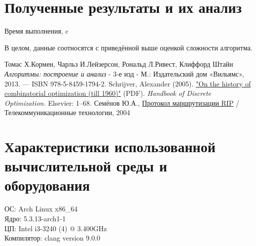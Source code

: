 \documentclass[a4paper,12pt]{article}
\begin{document}
\section{Полученные результаты и их анализ}
\begin{center}
  \begin{table}[h]
    \caption{Время выполнения, c}
  \end{table}
\end{center}
В целом, данные соотносятся с приведённой выше оценкой сложности алгоритма.
\begin{thebibliography}{9}
    Томас Х.Кормен, Чарльз И.Лейзерсон, Рональд Л.Ривест, Клиффорд Штайн
    \textit{Алгоритмы: построение и анализ}
    - 3-е изд - М.: Издательский дом «Вильямс», 2013. — ISBN 978-5-8459-1794-2.
    Schrijver, Alexander (2005). 
    \href{https://homepages.cwi.nl/~lex/files/histco.pdf}
    {"On the history of combinatorial optimization (till 1960)"} (PDF).
    \textit{Handbook of Discrete Optimization.} Elsevier: 1–68.
    Семёнов Ю.А.,
    \href{http://citforum.ru/nets/semenov/4/44/rip44111.shtml}{Протокол маршрутизации RIP}
    / Телекоммуникационные технологии, 2004
    
\end{thebibliography}
\section{Характеристики использованной вычислительной среды и оборудования}
ОС: Arch Linux x86\_64 \\
Ядро: 5.3.13-arch1-1 \\
ЦП: Intel i3-3240 (4) @ 3.400GHz \\
Компилятор: clang version 9.0.0
\end{document}
